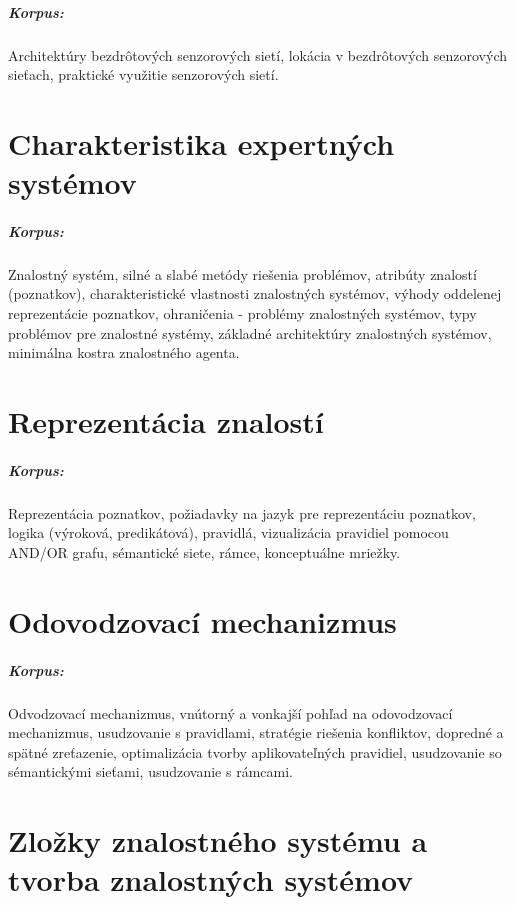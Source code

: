\documentclass[11pt,a4paper]{report}
\begin{document}
\paragraph{Korpus:} Architektúry bezdrôtových senzorových sietí, lokácia v bezdrôtových senzorových sieťach, praktické využitie senzorových sietí. 

\chapter{Charakteristika expertných systémov}

\paragraph{Korpus:} Znalostný systém, silné a slabé metódy riešenia problémov, atribúty znalostí (poznatkov), charakteristické vlastnosti znalostných systémov, výhody oddelenej reprezentácie poznatkov, ohraničenia - problémy znalostných systémov, typy problémov pre znalostné systémy, základné architektúry znalostných systémov, minimálna kostra znalostného agenta.

\chapter{Reprezentácia znalostí}

\paragraph{Korpus:} Reprezentácia poznatkov, požiadavky na jazyk pre reprezentáciu poznatkov, logika (výroková, predikátová), pravidlá, vizualizácia pravidiel pomocou AND/OR grafu, sémantické siete, rámce, konceptuálne mriežky.

\chapter{Odovodzovací mechanizmus}

\paragraph{Korpus:} Odvodzovací mechanizmus, vnútorný a vonkajší pohľad na odovodzovací mechanizmus, usudzovanie s pravidlami, stratégie riešenia konfliktov, dopredné a spätné zreťazenie, optimalizácia tvorby aplikovateľných pravidiel, usudzovanie so sémantickými sieťami, usudzovanie s rámcami.

\chapter{Zložky znalostného systému a tvorba znalostných systémov}
\end{document}
